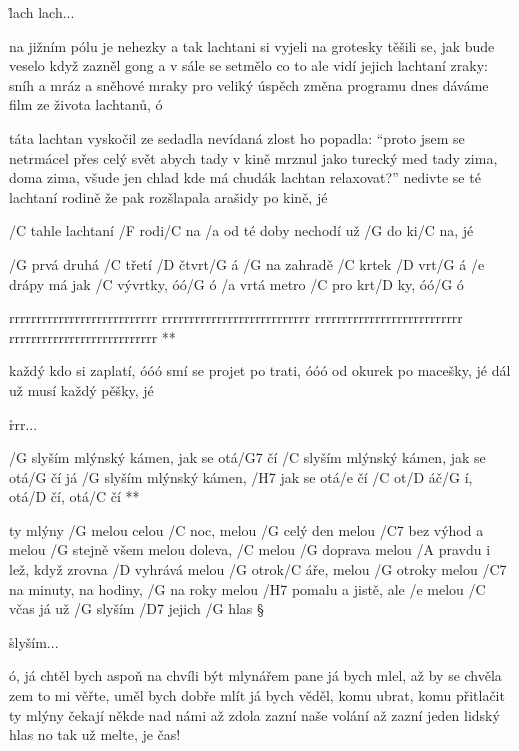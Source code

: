 \r  lach lach...

na jižním pólu je nehezky
a tak lachtani si vyjeli na grotesky
těšili se, jak bude veselo
když zazněl gong a v sále se setmělo
co to ale vidí jejich lachtaní zraky:
sníh a mráz a sněhové mraky
pro veliký úspěch změna programu
dnes dáváme film ze života lachtanů, ó

\rr

táta lachtan vyskočil ze sedadla
nevídaná zlost ho popadla:
``proto jsem se netrmácel přes celý svět
abych tady v kině mrznul jako turecký med
tady zima, doma zima, všude jen chlad
kde má chudák lachtan relaxovat?''
nedivte se té lachtaní rodině
že pak rozšlapala arašidy po kině, jé

\rr

/C tahle lachtaní /F rodi/C na
/a od té doby nechodí už /G do ki/C na, jé




/G prvá druhá /C třetí /D čtvrt/G á
/G na zahradě /C krtek /D vrt/G á
/e drápy má jak /C vývrtky, óó/G ó
/a vrtá metro /C pro krt/D ky, óó/G ó

\R rrrrrrrrrrrrrrrrrrrrrrrrrrr
   rrrrrrrrrrrrrrrrrrrrrrrrrrr
   rrrrrrrrrrrrrrrrrrrrrrrrrrr
   rrrrrrrrrrrrrrrrrrrrrrrrrrr **

každý kdo si zaplatí, óóó
smí se projet po trati, óóó
od okurek po macešky, jé
dál už musí každý pěšky, jé

\r rrr...




\R /G slyším mlýnský kámen, jak se otá/G7 čí
   /C slyším mlýnský kámen, jak se otá/G čí
   já /G slyším mlýnský kámen, /H7 jak se otá/e čí
   /C ot/D áč/G í, otá/D čí, otá/C čí **

ty mlýny /G melou celou /C noc, melou /G celý den
melou /C7 bez výhod a melou /G stejně všem
melou doleva, /C melou /G doprava
melou /A pravdu i lež, když zrovna /D vyhrává
melou /G otrok/C áře, melou /G otroky
melou /C7 na minuty, na hodiny, /G na roky
melou /H7 pomalu a jistě, ale /e melou /C včas
já už /G slyším /D7 jejich /G hlas \S

\r slyším...

ó, já chtěl bych aspoň na chvíli být mlynářem
pane já bych mlel, až by se chvěla zem
to mi věřte, uměl bych dobře mlít
já bych věděl, komu ubrat, komu přitlačit
ty mlýny čekají někde nad námi
až zdola zazní naše volání
až zazní jeden lidský hlas
no tak už melte, je čas! \s

